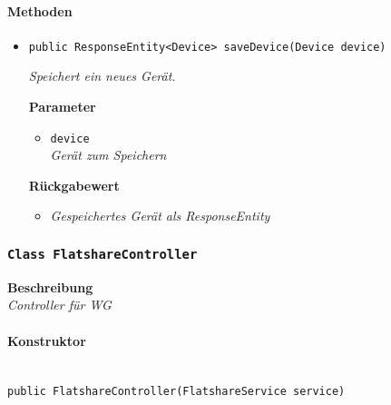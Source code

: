      \paragraph*{Methoden}
     \begin{itemize}
     	\item{\texttt{public ResponseEntity<Device> saveDevice(Device device)}}
     	
     	\textit{Speichert ein neues Gerät.}
     	
     	\textbf{Parameter}
     	\begin{itemize}
     		\item\texttt{device}\\
     		\textit{Gerät zum Speichern} 
     	\end{itemize}
     	
     	\textbf{Rückgabewert}
     	\begin{itemize}
     		\item\textit{Gespeichertes Gerät als ResponseEntity} 
     	\end{itemize}
     \end{itemize}
 
     \subsubsection{\texttt{Class FlatshareController}}
     \textbf{Beschreibung} \\
     \textit{Controller für WG}
     \paragraph*{Konstruktor}\mbox{} \\
     \texttt{public FlatshareController(FlatshareService service)}

